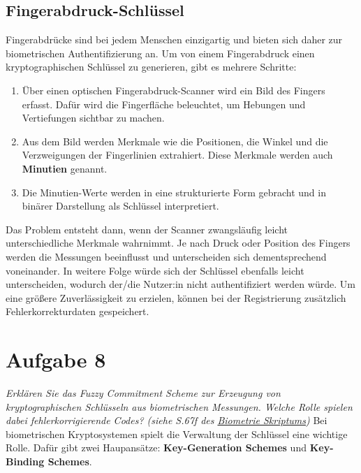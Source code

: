 \documentclass{article}
\begin{document}
    \subsection{Fingerabdruck-Schlüssel}
    Fingerabdrücke sind bei jedem Menschen einzigartig und bieten sich daher zur biometrischen Authentifizierung an.
    Um von einem Fingerabdruck einen kryptographischen Schlüssel zu generieren, gibt es mehrere Schritte:
    \begin{enumerate}
        \item Über einen optischen Fingerabdruck-Scanner wird ein Bild des Fingers erfasst. Dafür wird
        die Fingerfläche beleuchtet, um Hebungen und Vertiefungen sichtbar zu machen.
        \item Aus dem Bild werden Merkmale wie die Positionen, die Winkel und die Verzweigungen der Fingerlinien extrahiert.
        Diese Merkmale werden auch \textbf{Minutien} genannt.
        \item Die Minutien-Werte werden in eine strukturierte Form gebracht und in binärer Darstellung als Schlüssel interpretiert.
    \end{enumerate}
    Das Problem entsteht dann, wenn der Scanner zwangsläufig leicht unterschiedliche Merkmale wahrnimmt. Je nach 
    Druck oder Position des Fingers werden die Messungen beeinflusst und unterscheiden sich dementsprechend voneinander.
    In weitere Folge würde sich der Schlüssel ebenfalls leicht unterscheiden, wodurch der/die Nutzer:in nicht
    authentifiziert werden würde. Um eine größere Zuverlässigkeit zu erzielen, können bei der Registrierung 
    zusätzlich Fehlerkorrekturdaten gespeichert.
    \section{Aufgabe 8}
    \textit{Erklären Sie das Fuzzy Commitment Scheme zur Erzeugung von kryptographischen Schlüsseln aus 
    biometrischen Messungen. Welche Rolle spielen dabei fehlerkorrigierende Codes? (siehe S.67f des 
    \href{https://www.cosy.sbg.ac.at/~uhl/biometrics_slides.pdf}{Biometrie Skriptums})}\vspace*{1em}\newline
    Bei biometrischen Kryptosystemen spielt die Verwaltung der Schlüssel eine wichtige Rolle. Dafür gibt zwei
    Haupansätze: \textbf{Key-Generation Schemes} und \textbf{Key-Binding Schemes}.
\end{document}
